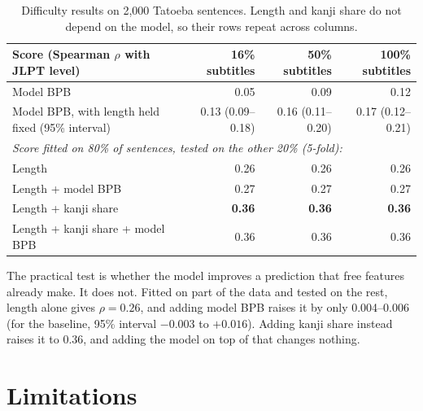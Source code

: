 \documentclass[11pt]{article}
\begin{document}
\begin{table}[H]
\centering\small
\begin{tabular}{lrrr}
\toprule
Score (Spearman $\rho$ with JLPT level) & 16\% subtitles & 50\% subtitles & 100\% subtitles \\
\midrule
Model BPB & 0.05 & 0.09 & 0.12 \\
Model BPB, with length held fixed (95\% interval) & 0.13 (0.09--0.18) & 0.16 (0.11--0.20) & 0.17 (0.12--0.21) \\
\midrule
\multicolumn{4}{l}{\emph{Score fitted on 80\% of sentences, tested on the other 20\% (5-fold):}} \\
Length & 0.26 & 0.26 & 0.26 \\
Length + model BPB & 0.27 & 0.27 & 0.27 \\
Length + kanji share & \textbf{0.36} & \textbf{0.36} & \textbf{0.36} \\
Length + kanji share + model BPB & 0.36 & 0.36 & 0.36 \\
\bottomrule
\end{tabular}
\caption{Difficulty results on 2{,}000 Tatoeba sentences. Length and kanji
share do not depend on the model, so their rows repeat across columns.}
\label{tab:diff}
\end{table}


The practical test is whether the model improves a prediction that free
features already make. It does not. Fitted on part of the data and tested on
the rest, length alone gives $\rho = 0.26$, and adding model BPB raises it by
only 0.004--0.006 (for the baseline, 95\% interval $-0.003$ to $+0.016$). Adding
kanji share instead raises it to 0.36, and adding the model on top of that
changes nothing.

\section{Limitations}
\end{document}
